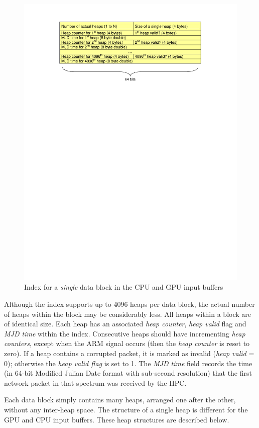 \documentclass[11pt]{article} %
\begin{document}
\begin{figure}[!ht]
\centering
\includegraphics*[width=12cm, viewport = 80 570 520 746]{figures/vegas-cpu-gpu-index.pdf}
\caption{Index for a {\em single} data block in the CPU and GPU input buffers}
\label{vegas-cpu-gpu-index}
\end{figure}

Although the index supports up to 4096 heaps per data block, the actual number of heaps within the block may be considerably less. All heaps within a block are of identical size. Each heap has an associated {\em heap counter}, {\em heap valid} flag and {\em MJD time} within the index. Consecutive heaps should have incrementing {\em heap counters}, except when the ARM signal occurs (then the {\em heap counter} is reset to zero). If a heap contains a corrupted packet, it is marked as invalid ({\em heap valid} = 0); otherwise the {\em heap valid flag} is set to 1. The {\em MJD time} field records the time (in 64-bit Modified Julian Date format with sub-second resolution) that the first network packet in that spectrum was received by the HPC.

Each data block simply contains many heaps, arranged one after the other, without any inter-heap space. The structure of a single heap is different for the GPU and CPU input buffers. These heap structures are described below.
\end{document}
